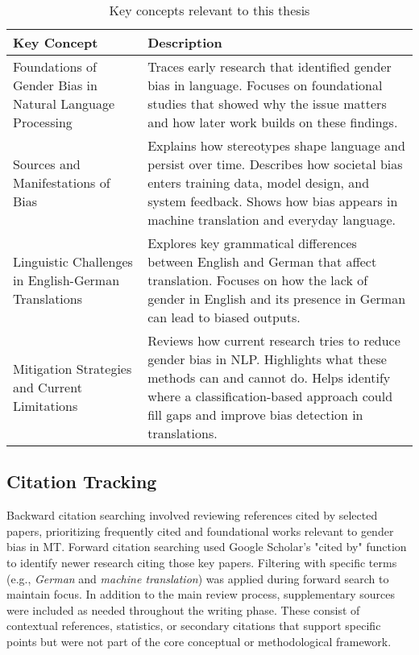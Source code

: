 \renewcommand{\arraystretch}{1.3}
\begin{table}[ht!]
\centering
\begin{tabularx}{\textwidth}{>{\raggedright\arraybackslash}p{6.5cm}X}
\toprule
\textbf{Key Concept} & \textbf{Description} \\
\midrule

Foundations of Gender Bias in Natural Language Processing & Traces early research that identified gender bias in language. Focuses on foundational studies that showed why the issue matters and how later work builds on these findings. \\

Sources and Manifestations of Bias & Explains how stereotypes shape language and persist over time. Describes how societal bias enters training data, model design, and system feedback. Shows how bias appears in machine translation and everyday language. \\

Linguistic Challenges in English-German Translations & Explores key grammatical differences between English and German that affect translation. Focuses on how the lack of gender in English and its presence in German can lead to biased outputs. \\

Mitigation Strategies and Current Limitations & Reviews how current research tries to reduce gender bias in NLP. Highlights what these methods can and cannot do. Helps identify where a classification-based approach could fill gaps and improve bias detection in translations. \\

\bottomrule
\end{tabularx}
\caption{Key concepts relevant to this thesis}
\label{tab:key-concepts}
\end{table}


\subsection{Citation Tracking}
Backward citation searching involved reviewing references cited by selected papers, prioritizing frequently cited and foundational works relevant to gender bias in MT. Forward citation searching used Google Scholar's "cited by" function to identify newer research citing those key papers. Filtering with specific terms (e.g., \textit{German} and \textit{machine translation}) was applied during forward search to maintain focus. In addition to the main review process, supplementary sources were included as needed throughout the writing phase. These consist of contextual references, statistics, or secondary citations that support specific points but were not part of the core conceptual or methodological framework.

